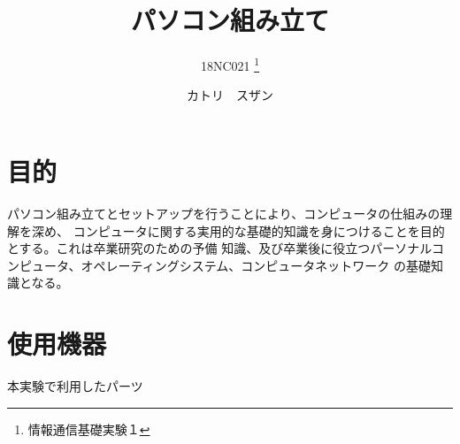 \documentclass[10pt]{article}
\title{パソコン組み立て}
\author{18NC021 \thanks{情報通信基礎実験１}}
\date{カトリ　スザン}
\begin{document}
	\begin{titlepage}
		\maketitle
	\end{titlepage}
	
	\tableofcontents
	\pagebreak
	
	\section{目的}
	
	パソコン組み立てとセットアップを行うことにより、コンピュータの仕組みの理解を深め、
	コンピュータに関する実用的な基礎的知識を身につけることを目的とする。これは卒業研究のための予備
	知識、及び卒業後に役立つパーソナルコンピュータ、オペレーティングシステム、コンピュータネットワーク
	の基礎知識となる。
	
	\section{使用機器}
	
	本実験で利用したパーツ
	
	
	\begingroup
	\setlength{\tabcolsep}{5pt} %
	\renewcommand{\arraystretch}{1.5} %
	
\end{document}
